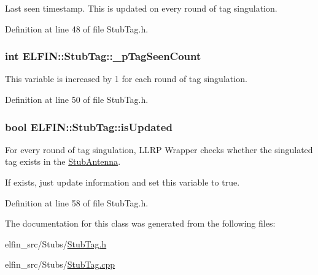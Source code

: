 Last seen timestamp. This is updated on every round of tag singulation. 



Definition at line 48 of file Stub\-Tag.\-h.

\hypertarget{class_e_l_f_i_n_1_1_stub_tag_aaad01b7bf25e718764daf86a4ed36942}{
\subsubsection[{\-\_\-p\-Tag\-Seen\-Count}]{\setlength{\rightskip}{0pt plus 5cm}int E\-L\-F\-I\-N\-::\-Stub\-Tag\-::\-\_\-p\-Tag\-Seen\-Count}}\label{class_e_l_f_i_n_1_1_stub_tag_aaad01b7bf25e718764daf86a4ed36942}


This variable is increased by 1 for each round of tag singulation. 



Definition at line 50 of file Stub\-Tag.\-h.

\hypertarget{class_e_l_f_i_n_1_1_stub_tag_a999ab50f0ec8aac7e849fdd83d47705f}{
\subsubsection[{is\-Updated}]{\setlength{\rightskip}{0pt plus 5cm}bool E\-L\-F\-I\-N\-::\-Stub\-Tag\-::is\-Updated}}\label{class_e_l_f_i_n_1_1_stub_tag_a999ab50f0ec8aac7e849fdd83d47705f}


For every round of tag singulation, L\-L\-R\-P Wrapper checks whether the singulated tag exists in the \hyperlink{class_e_l_f_i_n_1_1_stub_antenna}{Stub\-Antenna}.\par
If exists, just update information and set this variable to true. 



Definition at line 58 of file Stub\-Tag.\-h.



The documentation for this class was generated from the following files\-:\begin{DoxyCompactItemize}
\item 
elfin\-\_\-src/\-Stubs/\hyperlink{_stub_tag_8h}{Stub\-Tag.\-h}\item 
elfin\-\_\-src/\-Stubs/\hyperlink{_stub_tag_8cpp}{Stub\-Tag.\-cpp}\end{DoxyCompactItemize}
